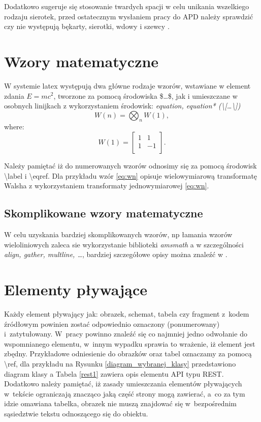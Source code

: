 \documentclass[twoside]{wfiisul}
\begin{document}
Dodatkowo sugeruje się stosowanie twardych spacji w celu unikania wszelkiego rodzaju sierotek, przed ostatecznym wysłaniem pracy do APD należy sprawdzić czy nie występują  bękarty, sierotki, wdowy i szewcy \cite{Bekart}.

\section{Wzory matematyczne}
W systemie latex występują dwa główne rodzaje wzorów, wstawiane w element zdania $E = mc^2$, tworzone za pomocą środowiska \$\dots\$, jak i umieszczane w osobnych linijkach z wykorzystaniem środowisk: \textit{equation, equation* (\textbackslash[\dots\textbackslash])}
\begin{equation}\label{eq:wn}
W(n) = \bigotimes_{n} W(1),
\end{equation}
where:
\begin{equation}\label{eq:w1}
W(1) = \begin{bmatrix}
         1 & 1 \\
         1 & -1 \\
       \end{bmatrix}.
\end{equation}

Należy pamiętać iż do numerowanych wzorów odnosimy się za pomocą środowisk {\textbackslash}label i {\textbackslash}eqref. Dla przykładu wzór \eqref{eq:wn} opisuje wielowymiarową transformatę Walsha z wykorzystaniem transformaty jednowymiarowej \eqref{eq:wn}.

\subsection{Skomplikowane wzory matematyczne}
W celu uzyskania bardziej skomplikowanych wzorów, np łamania wzorów wieloliniowych zaleca sie wykorzystanie biblioteki \textit{amsmath} a w szczególności \textit{align, gather, multline, \dots}, bardziej szczegółowe opisy można znaleźć w \cite{latex_math_wiki}.

\section{Elementy pływające}
Każdy element pływający jak: obrazek, schemat, tabela czy fragment z~kodem źródłowym powinien zostać odpowiednio oznaczony (ponumerowany) i~zatytułowany. W~pracy powinno znaleźć się co najmniej jedno odwołanie do wspomnianego elementu, w~innym wypadku sprawia to wrażenie, iż element jest zbędny. Przykładowe odniesienie do obrazków oraz tabel oznaczamy za pomocą {\textbackslash}ref, dla przykładu na Rysunku \ref{diagram_wybranej_klasy} przedstawiono diagram klasy a Tabela \ref{rest1} zawiera opis elementu API typu REST. Dodatkowo należy pamiętać, iż zasady umieszczania elementów pływających w~tekście ograniczają znacząco jaką część strony mogą zawierać, a~co za tym idzie omawiana tabelka, obrazek nie muszą znajdować się w~bezpośrednim sąsiedztwie tekstu odnoszącego się do obiektu.
\end{document}
